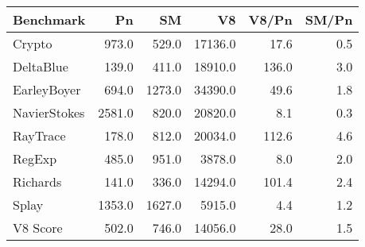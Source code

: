 \begin{tabular}{|l|r|r|r|r|r|}
  \hline
  Benchmark & Pn & SM & V8 & V8/Pn & SM/Pn \\
  \hline \hline
  Crypto & 973.0 & 529.0 & 17136.0 & 17.6 & 0.5\\
  \hline
  DeltaBlue & 139.0 & 411.0 & 18910.0 & 136.0 & 3.0\\
  \hline
  EarleyBoyer & 694.0 & 1273.0 & 34390.0 & 49.6 & 1.8\\
  \hline
  NavierStokes & 2581.0 & 820.0 & 20820.0 & 8.1 & 0.3\\
  \hline
  RayTrace & 178.0 & 812.0 & 20034.0 & 112.6 & 4.6\\
  \hline
  RegExp & 485.0 & 951.0 & 3878.0 & 8.0 & 2.0\\
  \hline
  Richards & 141.0 & 336.0 & 14294.0 & 101.4 & 2.4\\
  \hline
  Splay & 1353.0 & 1627.0 & 5915.0 & 4.4 & 1.2\\
  \hline
  \hline
  V8 Score & 502.0 & 746.0 & 14056.0 & 28.0 & 1.5\\
  \hline
\end{tabular}
